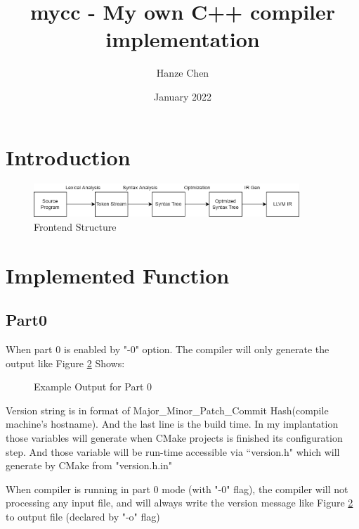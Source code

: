 \documentclass{article}
\title{mycc - My own C++ compiler implementation}
\author{Hanze Chen}
\date{January 2022}
\begin{document}
\maketitle
\section{Introduction}
    \begin{figure}[hb!]
        \centering
        \includegraphics[width=10cm]{figure/frontend_structure.png}
        \caption{Frontend Structure}
        \label{Fig:frontend_structure}
    \end{figure}
\section{Implemented Function}
\subsection{Part0}
    When part 0 is enabled by "-0" option. The compiler will only generate the output like Figure \ref{Fig:example_part0_output} Shows: \par
    \begin{figure}[hb!]
        \centering
        \caption{Example Output for Part 0}
        \label{Fig:example_part0_output}
    \end{figure}

    Version string is in format of Major\_Minor\_Patch\_Commit Hash(compile machine's hostname). And the last line is the build time. In my implantation those variables will generate when CMake projects is finished its configuration step. And those variable will be run-time accessible via “version.h" which will generate by CMake from "version.h.in" \par

    When compiler is running in part 0 mode (with "-0" flag), the compiler will not processing any input file, and will always write the version message like Figure \ref{Fig:example_part0_output} to output file (declared by "-o" flag)
\end{document}
